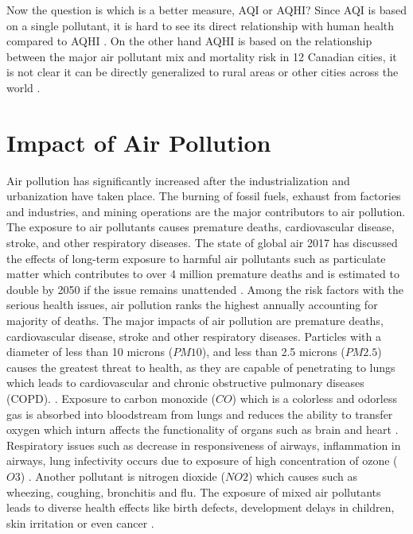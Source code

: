 Now the question is which is a better measure, AQI or AQHI? Since AQI is based on a single pollutant, it is hard to see its direct relationship with human health compared to AQHI \cite{Chen2013}. On the other hand AQHI is based on the relationship between the major air pollutant mix and mortality risk in 12 
Canadian cities, it is not clear it can be directly generalized to rural
areas or other cities across the world \cite{Chen2013}.



\section{Impact of Air Pollution}

Air pollution has significantly increased after the industrialization and urbanization have taken place. The burning of fossil fuels, exhaust from factories and industries, and mining operations are the major contributors to air pollution. The exposure to air pollutants causes premature deaths, cardiovascular disease, stroke, and other respiratory diseases. The state of global air 2017 has discussed the effects of long-term exposure to harmful air pollutants such as particulate matter which contributes to over 4 million premature deaths and is estimated to
double by 2050 if the issue remains unattended \cite{HealthEffectsInstitute2017}. Among the risk factors with the serious health issues, air pollution ranks the highest annually accounting for majority of deaths. The major impacts of air pollution are premature deaths, cardiovascular disease, stroke and other respiratory diseases.
Particles with a diameter of less than 10 microns ($PM10$), and less than 2.5 microns ($PM2.5$) causes the greatest threat to health, as they are capable of penetrating to lungs which leads to cardiovascular and chronic obstructive pulmonary diseases (COPD). \cite{who} \cite{Tian2016}. Exposure to carbon monoxide ($CO$) which is a colorless and odorless gas is absorbed into bloodstream from lungs and reduces the ability to transfer oxygen which inturn affects the functionality of organs such as brain and heart \cite{Sierra-vargas2012} \cite{Golbabaei2012}. Respiratory issues such as decrease in responsiveness of airways, inflammation in airways, lung infectivity occurs due to exposure of high concentration of ozone ($O3$) \cite{Lippmann1989}. Another pollutant is nitrogen dioxide ($NO2$) which causes such as wheezing, coughing, bronchitis and flu. The exposure of mixed air pollutants leads to diverse health effects like birth defects, development delays in children, skin irritation or even cancer \cite{MarilenaKampa2007}.

